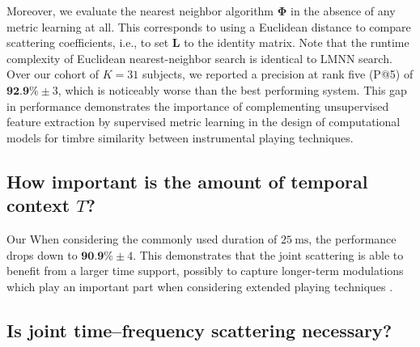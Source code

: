 \documentclass{bmcart}
\begin{document}
Moreover, we evaluate the nearest neighbor algorithm $\mathbf{\Phi}$ in the absence of any metric learning at all.
This corresponds to using a Euclidean distance to compare scattering coefficients, i.e., to set $\mathbf{L}$ to the identity matrix.
Note that the runtime complexity of Euclidean nearest-neighbor search is identical to LMNN search.
Over our cohort of $K=31$ subjects, we reported a precision at rank five (P@5) of $\textbf{92.9\%} \pm 3$, which is noticeably worse than the best performing system.
This gap in performance demonstrates the importance of complementing unsupervised feature extraction by supervised metric learning in the design  of computational models for timbre similarity between instrumental playing techniques.




\subsection*{How important is the amount of temporal context $T$?}

Our 
When considering the commonly used duration of $25~\mathrm{ms}$, the performance drops down to $\textbf{90.9\%} \pm 4$. This demonstrates that the joint scattering is able to benefit from a larger time support, possibly to capture longer-term modulations which play an important part when considering extended playing techniques \cite{lostanlen2018extended}.


\subsection*{Is joint time--frequency scattering necessary?}
\end{document}
